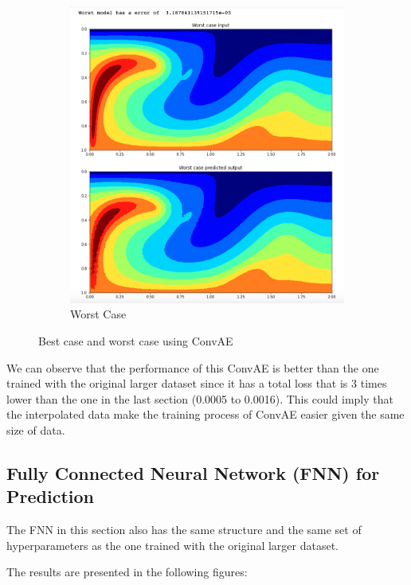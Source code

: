 \begin{figure}[H]
\begin{subfigure}{0.45\textwidth}
    \includegraphics[width=\textwidth]{figures/mantle_convection_images/larger_dataset_interpolated/ConvAE_Worst.png}
    \caption{Worst Case}
    \label{fig:second}
\end{subfigure}
        
\caption{Best case and worst case using ConvAE}
\label{fig:figures}
\end{figure}

We can observe that the performance of this ConvAE is better than the one trained with the original larger dataset since it has a total loss that is 3 times lower than the one in the last section (0.0005 to 0.0016). This could imply that the interpolated data make the training process of ConvAE easier given the same size of data. 


\subsection{Fully Connected Neural Network (FNN) for Prediction}

The FNN in this section also has the same structure and the same set of hyperparameters as the one trained with the original larger dataset.

The results are presented in the following figures:

